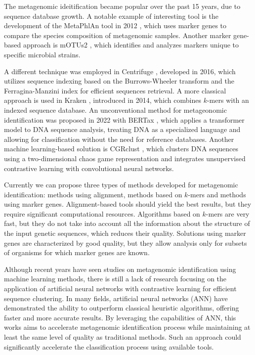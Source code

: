 \documentclass[pdflatex,sn-vancouver-num]{sn-jnl}%
\begin{document}
    The metagenomic ideitification became popular over the past 15 years, due to sequence database growth.
    A notable example of interesting tool is the development of the MetaPhlAn tool in 2012 \cite{Segata:2012}, which uses marker genes to compare the species composition of metagenomic samples.
    Another marker gene-based approach is mOTUs2 \cite{Milanese:2019}, which identifies and analyzes markers unique to specific microbial strains.

    A different technique was employed in Centrifuge \cite{Kim:2016}, developed in 2016,
    which utilizes sequence indexing based on the Burrows-Wheeler transform \cite{Burrows:1994} and the Ferragina-Manzini index \cite{Ferragina:2000} for efficient sequences retrieval.
    A more classical approach is used in Kraken \cite{Wood:2014}, introduced in 2014, which combines $k$-mers with an indexed sequence database.
    An unconventional method for metageonomic identification was proposed in 2022 with BERTax \cite{Mock:2022}, which applies a transformer model \cite{Transformers} to DNA sequence analysis,
    treating DNA as a specialized language and allowing for classification without the need for reference databases.
    Another machine learning-based solution is CGRclust \cite{Alipour:2024}, which clusters DNA sequences using a two-dimensional chaos game representation and integrates unsupervised contrastive learning with convolutional neural networks.

    Currently we can propose three types of methods developed for metagenomic identification: methods using alignment, methods based on $k$-mers and methods using marker genes.
    Alignment-based tools should yield the best results, but they require significant computational resources.
    Algorithms based on $k$-mers are very fast, but they do not take into account all the information about the structure of the input genetic sequences, which reduces their quality.
    Solutions using marker genes are characterized by good quality, but they allow analysis only for subsets of organisms for which marker genes are known.

    Although recent years have seen studies on metagenomic identification using machine learning methods, there is still
    a lack of research focusing on the application of artificial neural networks with contrastive learning for efficient sequence clustering.
    In many fields, artificial neural networks (ANN) have demonstrated the ability to outperform classical heuristic algorithms, offering faster and more accurate results.
    By leveraging the capabilities of ANN, this works aims to accelerate metagenomic identification process while maintaining at least the same level of quality as traditional methods.
    Such an approach could significantly accelerate the classification process using available tools.
\end{document}
